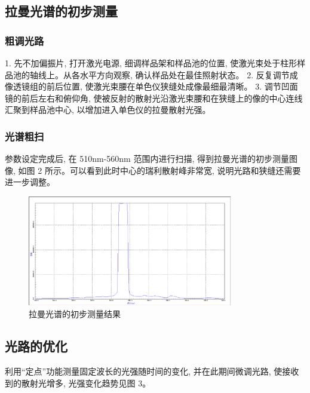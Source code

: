 \documentclass{article}
\begin{document}
\subsection{拉曼光谱的初步测量}

\subsubsection{粗调光路}
1. 先不加偏振片, 打开激光电源, 细调样品架和样品池的位置, 使激光束处于柱形样品池的轴线上。从各水平方向观察, 确认样品处在最佳照射状态。
2. 反复调节成像透镜组的前后位置, 使激光束腰在单色仪狭缝处成像最细最清晰。
3. 调节凹面镜的前后左右和俯仰角, 使被反射的散射光沿激光束腰和在狭缝上的像的中心连线汇聚到样品池中心, 以增加进入单色仪的拉曼散射光强。

\subsubsection{光谱粗扫}

参数设定完成后, 在 510nm-560nm 范围内进行扫描, 得到拉曼光谱的初步测量图像, 如图 2 所示。可以看到此时中心的瑞利散射峰非常宽, 说明光路和狭缝还需要进一步调整。

\begin{figure}[h]
    \centering
    \includegraphics[width=0.8\textwidth]{图片 2.png} %
    \caption{拉曼光谱的初步测量结果}
    \label{fig:rough_scan}
\end{figure}

\subsection{光路的优化}

利用“定点”功能测量固定波长的光强随时间的变化, 并在此期间微调光路, 使接收到的散射光增多, 光强变化趋势见图 3。
\end{document}
